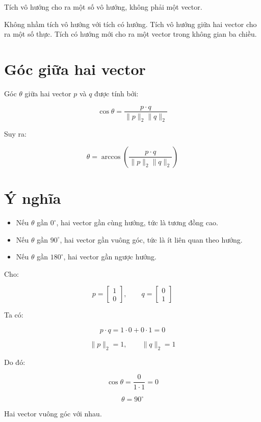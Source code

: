 \documentclass[12pt,a4paper]{report}
\begin{document}
Tích vô hướng cho ra một số vô hướng, không phải một vector.

\begin{luuy}
Không nhầm tích vô hướng với tích có hướng. Tích vô hướng giữa hai vector cho ra một số thực. Tích có hướng mới cho ra một vector trong không gian ba chiều.
\end{luuy}

\section{Góc giữa hai vector}

Góc $\theta$ giữa hai vector $p$ và $q$ được tính bởi:

\[
    \cos\theta =
    \frac{p \cdot q}{\|p\|_2 \|q\|_2}
\]

Suy ra:

\[
    \theta = \arccos\left(\frac{p \cdot q}{\|p\|_2 \|q\|_2}\right)
\]

\section{Ý nghĩa}

\begin{itemize}
    \item Nếu $\theta$ gần $0^\circ$, hai vector gần cùng hướng, tức là tương đồng cao.
    \item Nếu $\theta$ gần $90^\circ$, hai vector gần vuông góc, tức là ít liên quan theo hướng.
    \item Nếu $\theta$ gần $180^\circ$, hai vector gần ngược hướng.
\end{itemize}

\begin{vidu}
Cho:

\[
    p =
    \begin{bmatrix}
    1\\0
    \end{bmatrix},
    \qquad
    q =
    \begin{bmatrix}
    0\\1
    \end{bmatrix}
\]

Ta có:

\[
    p \cdot q = 1\cdot 0 + 0\cdot 1 = 0
\]

\[
    \|p\|_2=1,\qquad \|q\|_2=1
\]

Do đó:

\[
    \cos\theta = \frac{0}{1\cdot 1}=0
\]

\[
    \theta = 90^\circ
\]

Hai vector vuông góc với nhau.
\end{vidu}
\end{document}
